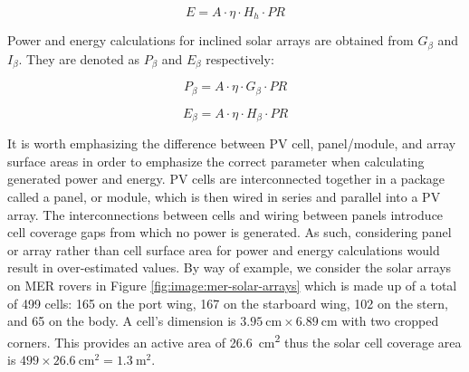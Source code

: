 \begin{equation}
  \label{eq:SA_energy}
  E = A \cdot \eta \cdot H_{h} \cdot PR
\end{equation}

Power and energy calculations for inclined solar arrays are obtained from $G_{\beta}$ and $I_{\beta}$. They are denoted as $P_{\beta}$ and $E_{\beta}$ respectively:

\begin{equation}
  \label{eq:SA_slope_power}
  P_{\beta} = A \cdot \eta \cdot G_{\beta} \cdot PR
\end{equation}


\begin{equation}
  \label{eq:SA_slope_energy}
  E_{\beta} = A \cdot \eta \cdot H_{\beta} \cdot PR
\end{equation}

It is worth emphasizing the difference between PV cell, panel/module, and array surface areas in order to emphasize the correct parameter when calculating generated power and energy. PV cells are interconnected together in a package called a panel, or module, which is then wired in series and parallel into a PV array. The interconnections between cells and wiring between panels introduce cell coverage gaps from which no power is generated. As such, considering panel or array rather than cell surface area for power and energy calculations would result in over-estimated values. By way of example, we consider the solar arrays on MER rovers in Figure \ref{fig:image:mer-solar-arrays} which is made up of a total of 499 cells: 165 on the port wing, 167 on the starboard wing, 102 on the stern, and 65 on the body. A cell's dimension is $\SI{3.95}{\centi\meter} \times \SI{6.89}{\centi\meter}$ with two cropped corners. This provides an active area of \SI{26.6}{\centi\meter\squared} thus the solar cell coverage area is $499 \times \SI{26.6}{\centi\meter\squared} = \SI{1.3}{\meter\squared}$.


